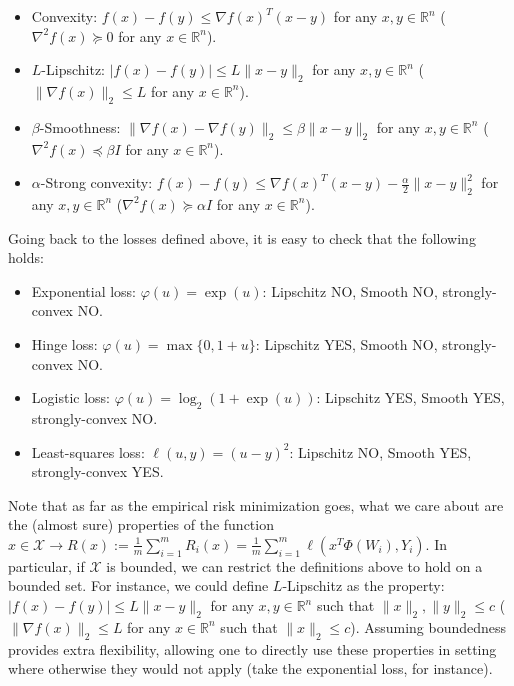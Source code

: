 \begin{itemize}
	\item Convexity: $f(x) - f(y) \le \nabla f(x)^T(x - y)$ for any $x,y\in\mathbb{R}^n$ ($\nabla^2 f(x) \succcurlyeq 0$ for any $x\in\mathbb{R}^n$).
	\item $L$-Lipschitz: $| f(x) - f(y) | \le L \| x - y \|_2$ for any $x,y\in\mathbb{R}^n$ ($\|\nabla f(x)\|_2 \le L$ for any $x\in\mathbb{R}^n$).
	\item $\beta$-Smoothness: $\| \nabla f(x) - \nabla f(y) \|_2 \le \beta \| x - y \|_2$ for any $x,y\in\mathbb{R}^n$ ($\nabla^2 f(x) \preccurlyeq \beta I$ for any $x\in\mathbb{R}^n$).
	\item $\alpha$-Strong convexity: $f(x) - f(y) \le \nabla f(x)^T(x - y) - \frac{\alpha}{2}\|x - y\|_2^2$ for any $x,y\in\mathbb{R}^n$ ($\nabla^2 f(x) \succcurlyeq \alpha I$ for any $x\in\mathbb{R}^n$).
\end{itemize}

Going back to the losses defined above, it is easy to check that the following holds:
\begin{itemize}
\item Exponential loss: $\varphi(u) = \exp(u)$: Lipschitz NO, Smooth NO, strongly-convex NO.
\item Hinge loss: $\varphi(u) = \max\{0,1+u\}$: Lipschitz YES, Smooth NO, strongly-convex NO.
\item Logistic loss: $\varphi(u) = \log_2(1+\exp(u))$: Lipschitz YES, Smooth YES, strongly-convex NO.
\item Least-squares loss: $\ell(u,y) = (u-y)^2$: Lipschitz NO, Smooth YES, strongly-convex YES.
\end{itemize}

Note that as far as the empirical risk minimization goes, what we care about are the (almost sure) properties of the function $x\in\mathcal{X}\rightarrow R(x) := \frac{1}{m} \sum_{i=1}^m R_i(x) = \frac{1}{m} \sum_{i=1}^m \ell(x^T\Phi(W_i),Y_i)$. In particular, if $\mathcal{X}$ is bounded, we can restrict the definitions above to hold on a bounded set. For instance, we could define $L$-Lipschitz as the property: $| f(x) - f(y) | \le L \| x - y \|_2$ for any $x,y\in\mathbb{R}^n$ such that $\|x\|_2,\|y\|_2\le c$ ($\|\nabla f(x)\|_2 \le L$ for any $x\in\mathbb{R}^n$ such that $\|x\|_2\le c$). Assuming boundedness provides extra flexibility, allowing one to directly use these properties in setting where otherwise they would not apply (take the exponential loss, for instance).

